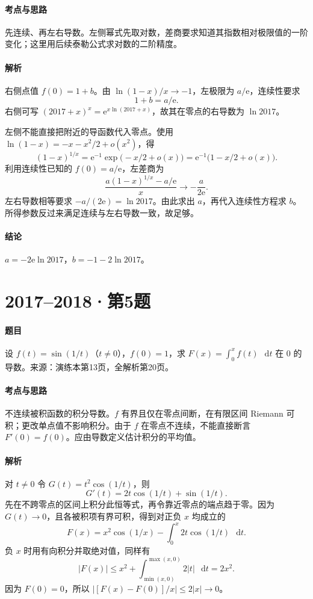 \documentclass[UTF8,fontset=fandol,12pt,oneside,openany]{ctexrep}
\newcommand{\dd}{\mathop{}\!\mathrm d}
\newcommand{\ee}{\mathrm e}
\theoremstyle{definition}
\begin{document}
\paragraph{考点与思路}先连续、再左右导数。左侧幂式先取对数，差商要求知道其指数相对极限值的一阶变化；这里用后续泰勒公式求对数的二阶精度。
\paragraph{解析}右侧点值 $f(0)=1+b$。由 $\ln(1-x)/x\to-1$，左极限为 $a/\ee$，连续性要求
\[
 1+b=a/\ee.
\]
右侧可写 $(2017+x)^x=\ee^{x\ln(2017+x)}$，故其在零点的右导数为 $\ln2017$。

左侧不能直接把附近的导函数代入零点。使用 $\ln(1-x)=-x-x^2/2+o(x^2)$，得
\[
 (1-x)^{1/x}
 =\ee^{-1}\exp\big(-x/2+o(x)\big)
 =\ee^{-1}\big(1-x/2+o(x)\big).
\]
利用连续性已知的 $f(0)=a/\ee$，左差商为
\[
 \frac{a(1-x)^{1/x}-a/\ee}x\longrightarrow-\frac a{2\ee}.
\]
左右导数相等要求 $-a/(2\ee)=\ln2017$。由此求出 $a$，再代入连续性方程求 $b$。所得参数反过来满足连续与左右导数一致，故足够。
\paragraph{结论}$a=-2\ee\ln2017$，$b=-1-2\ln2017$。

\par\addvspace{18pt}\noindent\begin{minipage}{\linewidth}
\section{2017--2018·第5题}
\paragraph{题目}设 $f(t)=\sin(1/t)$（$t\ne0$），$f(0)=1$，求
$F(x)=\int_0^x f(t)\,\dd t$ 在 $0$ 的导数。来源：演练本第13页，全解析第20页。
\end{minipage}\par
\paragraph{考点与思路}不连续被积函数的积分导数。$f$ 有界且仅在零点间断，在有限区间 Riemann 可积；更改单点值不影响积分。由于 $f$ 在零点不连续，不能直接断言 $F'(0)=f(0)$。应由导数定义估计积分的平均值。
\paragraph{解析}对 $t\ne0$ 令 $G(t)=t^2\cos(1/t)$，则
\[
 G'(t)=2t\cos(1/t)+\sin(1/t).
\]
先在不跨零点的区间上积分此恒等式，再令靠近零点的端点趋于零。因为 $G(t)\to0$，且各被积项有界可积，得到对正负 $x$ 均成立的
\[
 F(x)=x^2\cos(1/x)-\int_0^x2t\cos(1/t)\,\dd t.
\]
负 $x$ 时用有向积分并取绝对值，同样有
\[
 |F(x)|\le x^2+\int_{\min(x,0)}^{\max(x,0)}2|t|\,\dd t
 =2x^2.
\]
因为 $F(0)=0$，所以 $|[F(x)-F(0)]/x|\le2|x|\to0$。
\end{document}

